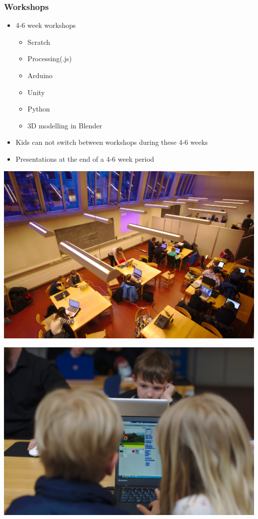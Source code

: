 \documentclass{beamer}
\begin{document}
\begin{frame}
\frametitle{Workshops}

\begin{itemize}
\item 4-6 week workshops
  \begin{itemize}
  \item Scratch
  \item Processing(.js)
  \item Arduino
  \item Unity
  \item Python
  \item 3D modelling in Blender
  \end{itemize}
\item Kids can not switch between workshops during these 4-6 weeks
\item Presentations at the end of a 4-6 week period
\end{itemize}


\end{frame}

\begin{frame}
 \vspace{5mm}
 \includegraphics[width=\textwidth]{imagery/codingpirates-diku}
\end{frame}

\begin{frame}
 \vspace{5mm}
 \includegraphics[width=\textwidth]{imagery/william-sofie}
\end{frame}
\end{document}
